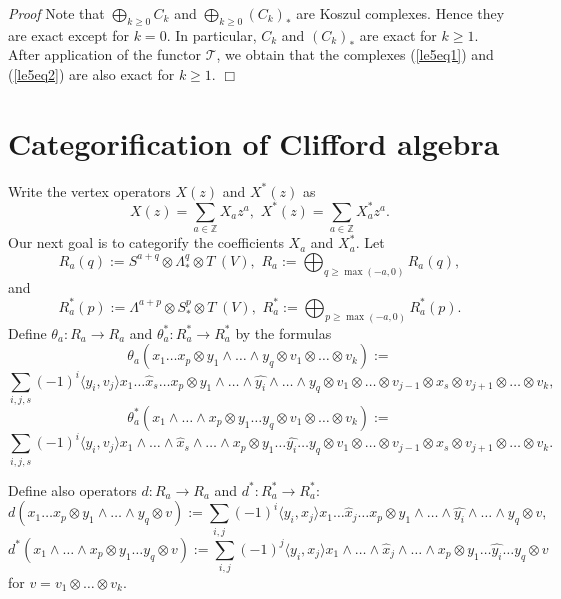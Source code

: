 \documentclass[11pt]{amsart}
\renewenvironment{proof}{ \emph{Proof}}{$\Box$}
\newcommand{\refeq}[1]{(\ref{#1})}
\begin{document}
\begin{proof}
Note that $\bigoplus_{k\geq 0}C_k$ and $\bigoplus_{k\geq 0}(C_k)_*$ are Koszul complexes. 
Hence they are exact except for $k=0$. In particular, $C_k$ and $(C_k)_*$ are exact for $k\geq 1$.
After application of the functor $\mathcal T$, we obtain that the complexes \refeq{le5eq1} and \refeq{le5eq2} are also exact
for $k\geq 1$.
\end{proof}

\section {Categorification of Clifford algebra}
Write the vertex operators $X(z)$ and $X^*(z)$ as
$$X(z)=\sum_{a\in\mathbb Z}X_az^a,\,\,X^*(z)=\sum_{a\in\mathbb Z}X^*_az^a.$$
Our next goal is to categorify the coefficients $X_a$ and $X_a^*$.
Let 
$$R_a(q):=S^{a+q}\otimes \Lambda^q_*\otimes T^{\cdot}(V),\,\,R_a:=\bigoplus_{q\geq\operatorname{max}(-a,0)} R_a(q),$$
and
$$R_a^*(p):=\Lambda^{a+p}\otimes S_*^{p}\otimes T^{\cdot}(V),\,\,R^*_a:=\bigoplus_{p\geq\operatorname{max}(-a,0)} R_a^*(p).$$
Define $\theta_a:R_a\to R_a$ and $\theta_a^*:R^*_a\to R^*_a$ by the formulas
$$\theta_a(x_1\dots x_p\otimes y_1\wedge\dots\wedge y_q\otimes v_1\otimes\dots\otimes v_k):=$$
$$\sum_{i,j,s}(-1)^i\langle y_i,v_j\rangle x_1\dots\hat{x}_s\dots x_p\otimes y_1\wedge\dots\wedge\hat{y_i}\wedge\dots\wedge y_q\otimes
v_1\otimes\dots\otimes v_{j-1}\otimes x_s\otimes v_{j+1}\otimes\dots\otimes v_k,$$
$$\theta_a^*(x_1\wedge\dots\wedge x_p\otimes y_1\dots y_q\otimes v_1\otimes\dots\otimes v_k):=$$
$$\sum_{i,j,s}(-1)^i\langle y_i,v_j\rangle x_1\wedge\dots\wedge\hat{x}_s\wedge\dots\wedge x_p\otimes y_1\dots\hat{y_i}\dots y_q\otimes
v_1\otimes\dots\otimes v_{j-1}\otimes x_s\otimes v_{j+1}\otimes\dots\otimes v_k.$$

Define also operators $d:R_a\to R_a$ and
$d^*:R^*_a\to R^*_a$:
$$d(x_1\dots x_p\otimes y_1\wedge\dots\wedge y_q\otimes v):=\sum_{i,j} (-1)^i \langle y_i,x_j\rangle 
 x_1\dots\hat{x}_j\dots x_p\otimes y_1\wedge\dots\wedge\hat{y_i}\wedge\dots\wedge y_q\otimes v,$$
$$d^*(x_1\wedge\dots\wedge x_p\otimes y_1\dots y_q\otimes v):=
\sum_{i,j}(-1)^j \langle y_i,x_j\rangle x_1\wedge\dots\wedge\hat{x}_j\wedge\dots\wedge x_p\otimes y_1\dots\hat{y_i}\dots y_q\otimes v$$
for $v=v_1\otimes\dots \otimes v_k$.
\end{document}
